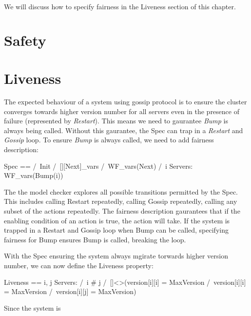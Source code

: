 We will discuss how to specify fairness in the Liveness section of this chapter.

\section{Safety}

\section{Liveness}

The expected behaviour of a system using gossip protocol is to ensure the
cluster converges towards higher version number for all servers even in the
presence of failure (represented by \textit{Restart}). This means we need to
gaurantee \textit{Bump} is always being called. Without this gaurantee, the Spec
can trap in a \textit{Restart} and \textit{Gossip} loop. To ensure \textit{Bump}
is always called, we need to add fairness description:\newline 

\begin{tla}
Spec ==
  /\ Init
  /\ [][Next]_vars
  /\ WF_vars(Next)
  /\ \A i \in Servers: 
    WF_vars(Bump(i))
\end{tla}
\begin{tlatex}
%
%
%
%
%
%
\end{tlatex}

The the model checker explores all possible transitions permitted by the Spec.
This includes calling Restart repeatedly, calling Gossip repeatedly, calling any
subset of the actions repeatedly. The fairness description gaurantees that if
the enabling condition of an action is true, the action will take. If the system
is trapped in a Restart and Gossip loop when Bump can be called, specifying fairness 
for Bump ensures Bump is called, breaking the loop.\newline

With the Spec ensuring the system always mgirate torwards higher version number, 
we can now define the Liveness property:\newline

\begin{tla}
Liveness == 
    \E i, j \in Servers: 
        /\ i # j
        /\ []<>(version[i][i] = MaxVersion /\ version[i][i] = MaxVersion /\ version[i][j] = MaxVersion)
\end{tla}
\begin{tlatex}
%
%
%
\end{tlatex}

Since the system is 

% 
